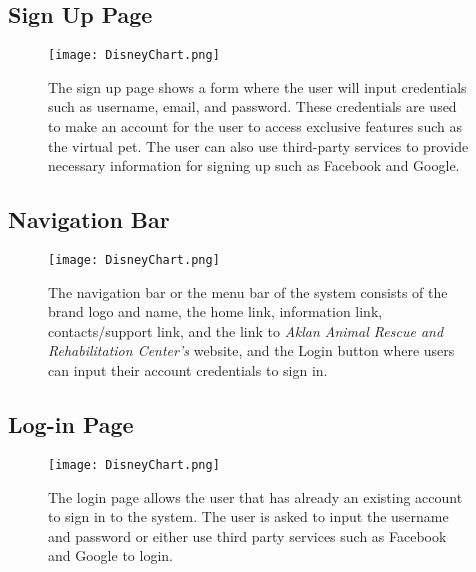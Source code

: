 \subsection{Sign Up Page}
\begin{figure}[H]                %
	\centering                    %
	\texttt{[image: DisneyChart.png]}      %
	\caption{
		The sign up page shows a form where the user will input credentials such as username, email, and password. These credentials are used to make an account for the user to access exclusive features such as the virtual pet. The user can also use third-party services to provide necessary information for signing up such as Facebook and Google.}
	\label{fig:Index}
\end{figure}

\subsection{Navigation Bar}
\begin{figure}[H]                %
	\centering                    %
	\texttt{[image: DisneyChart.png]}      %
	\caption{
	The navigation bar or the menu bar of the system consists of the brand logo and name, the home link, information link, contacts/support link, and the link to \emph{Aklan Animal Rescue and Rehabilitation Center’s} website, and the Login button where users can input their account credentials to sign in.}
	\label{fig:Index}
\end{figure}

\subsection{Log-in Page}
\begin{figure}[H]                %
	\centering                    %
	\texttt{[image: DisneyChart.png]}      %
	\caption{
	The login page allows the user that has already an existing account to sign in to the system. The user is asked to input the username and password or either use third party services such as Facebook and Google to login.}
	\label{fig:Index}
\end{figure}

